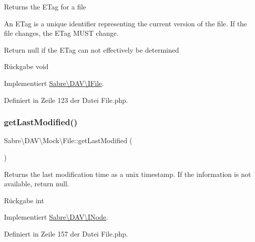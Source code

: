 Returns the E\+Tag for a file

An E\+Tag is a unique identifier representing the current version of the file. If the file changes, the E\+Tag M\+U\+ST change.

Return null if the E\+Tag can not effectively be determined

\begin{DoxyReturn}{Rückgabe}
void 
\end{DoxyReturn}


Implementiert \mbox{\hyperlink{interface_sabre_1_1_d_a_v_1_1_i_file_a2b207a6037dcbd4e7373b977dc60117f}{Sabre\textbackslash{}\+D\+A\+V\textbackslash{}\+I\+File}}.



Definiert in Zeile 123 der Datei File.\+php.

\mbox{\label{class_sabre_1_1_d_a_v_1_1_mock_1_1_file_a1d26087aae6d48c20b485368e1dcc511}} 
\subsubsection{\texorpdfstring{get\+Last\+Modified()}{getLastModified()}}
{\footnotesize\ttfamily Sabre\textbackslash{}\+D\+A\+V\textbackslash{}\+Mock\textbackslash{}\+File\+::get\+Last\+Modified (\begin{DoxyParamCaption}{ }\end{DoxyParamCaption})}

Returns the last modification time as a unix timestamp. If the information is not available, return null.

\begin{DoxyReturn}{Rückgabe}
int 
\end{DoxyReturn}


Implementiert \mbox{\hyperlink{interface_sabre_1_1_d_a_v_1_1_i_node_a06335f81c7d4ec2c6d9e327c8ce61014}{Sabre\textbackslash{}\+D\+A\+V\textbackslash{}\+I\+Node}}.



Definiert in Zeile 157 der Datei File.\+php.

\mbox{\label{class_sabre_1_1_d_a_v_1_1_mock_1_1_file_aea750206fc0c59d516357349b1e7d6e1}} 
